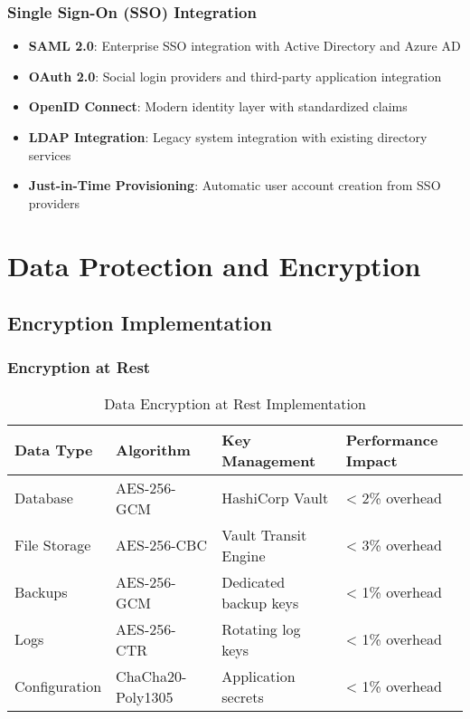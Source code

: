 \subsubsection{Single Sign-On (SSO) Integration}

\begin{itemize}
    \item \textbf{SAML 2.0}: Enterprise SSO integration with Active Directory and Azure AD
    \item \textbf{OAuth 2.0}: Social login providers and third-party application integration
    \item \textbf{OpenID Connect}: Modern identity layer with standardized claims
    \item \textbf{LDAP Integration}: Legacy system integration with existing directory services
    \item \textbf{Just-in-Time Provisioning}: Automatic user account creation from SSO providers
\end{itemize}

\section{Data Protection and Encryption}

\subsection{Encryption Implementation}

\subsubsection{Encryption at Rest}

\begin{table}[H]
\centering
\caption{Data Encryption at Rest Implementation}
\begin{tabular}{|p{3cm}|p{3cm}|p{3cm}|p{3cm}|}
\hline
\textbf{Data Type} & \textbf{Algorithm} & \textbf{Key Management} & \textbf{Performance Impact} \\
\hline
Database & AES-256-GCM & HashiCorp Vault & < 2\% overhead \\
\hline
File Storage & AES-256-CBC & Vault Transit Engine & < 3\% overhead \\
\hline
Backups & AES-256-GCM & Dedicated backup keys & < 1\% overhead \\
\hline
Logs & AES-256-CTR & Rotating log keys & < 1\% overhead \\
\hline
Configuration & ChaCha20-Poly1305 & Application secrets & < 1\% overhead \\
\hline
\end{tabular}
\end{table}

